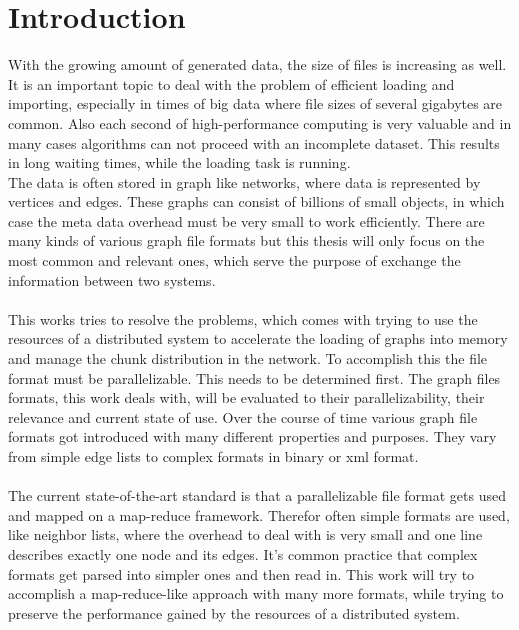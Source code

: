 \chapter{Introduction}
\label{Introduction}

With the growing amount of generated data, the size of files is increasing as well. It is an important topic to deal with the problem of efficient loading and importing, especially in times of big data where file sizes of several gigabytes are common. Also each second of high-performance computing is very valuable and in many cases algorithms can not proceed with an incomplete dataset. This results in long waiting times, while the loading task is running.\\
The data is often stored in graph like networks, where data is represented by vertices and edges. These graphs can consist of billions of small objects, in which case the meta data overhead must be very small to work efficiently. There are many kinds of various graph file formats but this thesis will only focus on the most common and relevant ones, which serve the purpose of exchange the information between two systems.\\\\
This works tries to resolve the problems, which comes with trying to use the resources of a distributed system to accelerate the loading of graphs into memory and manage the chunk distribution in the network. To accomplish this the file format must be parallelizable. This needs to be determined first. The graph files formats, this work deals with, will be evaluated to their parallelizability, their relevance and current state of use. Over the course of time various graph file formats got introduced with many different properties and purposes. They vary from simple edge lists to complex formats in binary or xml format.\\\\
The current state-of-the-art standard is that a parallelizable file format gets used and mapped on a map-reduce framework. Therefor often simple formats are used, like neighbor lists, where the overhead to deal with is very small and one line describes exactly one node and its edges. It's common practice that complex formats get parsed into simpler ones and then read in. This work will try to accomplish a map-reduce-like approach with many more formats, while trying to preserve the performance gained by the resources of a distributed system.

